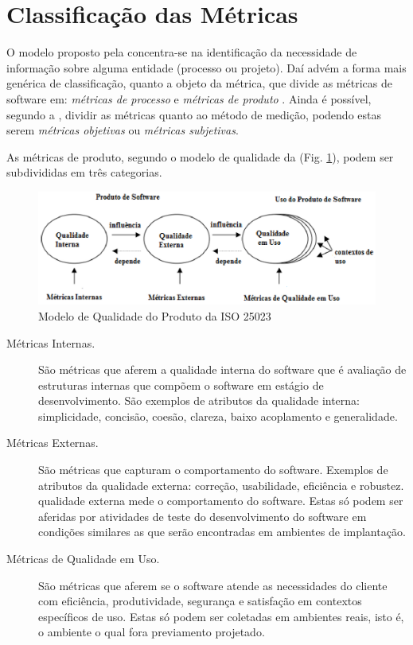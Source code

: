 	\section{Classificação das Métricas}	
	\label {Classificação das Métricas}
	O modelo proposto pela  concentra-se na identificação da necessidade de informação sobre alguma entidade (processo ou projeto). Daí advém a forma mais genérica de classificação, quanto a objeto da métrica, que divide as métricas de software em: \textit{métricas de processo} e \textit{métricas de produto} \cite{Mills:1999}. Ainda é possível, segundo a , dividir as métricas quanto ao método de medição, podendo estas serem \textit{métricas objetivas} ou \textit{métricas subjetivas}.
	
	As métricas de produto, segundo o modelo de qualidade da  (Fig. \ref{modelodequalidade}), podem ser subdivididas em três categorias. 
				
	\begin{figure}[h]
		\centering
			\includegraphics[keepaspectratio=false,scale=1.0]{figuras/modelodequalidade.eps}
		\caption{Modelo de Qualidade do Produto da ISO 25023}
		\label{modelodequalidade}
	\end{figure}
			
		\begin{description}
		\item[Métricas Internas.] 
		São métricas que aferem a qualidade interna do software que é avaliação de estruturas internas que compõem o software em estágio de desenvolvimento.  São exemplos de atributos da qualidade interna: simplicidade, concisão, coesão, clareza, baixo acoplamento e generalidade. 
			
		\item[Métricas Externas.]
		São métricas que capturam o comportamento do software. Exemplos de atributos da qualidade externa: correção, usabilidade, eficiência e robustez. qualidade externa mede  o comportamento do software. Estas só podem ser aferidas por atividades de teste do desenvolvimento do software em condições similares as que serão encontradas em ambientes de implantação.
			
		\item[Métricas de Qualidade em Uso.]
		 São métricas que aferem se o software atende as necessidades do cliente com eficiência, produtividade, segurança e satisfação em contextos específicos de uso. Estas só podem ser coletadas em ambientes reais, isto é, o ambiente o qual fora previamento projetado.
			 
		\end{description}
		

